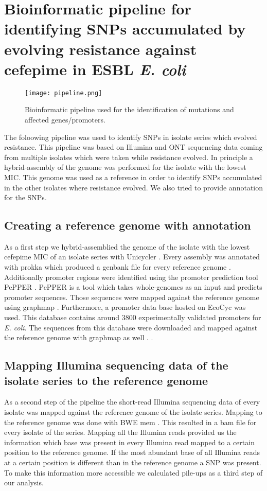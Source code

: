\section{Bioinformatic pipeline for identifying SNPs accumulated by evolving resistance against cefepime in ESBL \textit{E. coli}}
\label{section:pipeline}
\begin{figure}
	\texttt{[image: pipeline.png]}
	\caption{Bioinformatic pipeline used for the identification of mutations and affected genes/promoters.}
	\label{figure:pipeline}
\end{figure}
The foloowing pipeline was used to identify SNPs in isolate series which evolved resistance. This pipeline was based on Illumina and ONT sequencing data coming from multiple isolates which were taken while resistance evolved. In principle a hybrid-assembly of the genome was performed for the isolate with the lowest MIC. This genome was used as a reference in order to identify SNPs accumulated in the other isolates where resistance evolved. We also tried to provide annotation for the SNPs. 

\subsection{Creating a reference genome with annotation} 
As a first step we hybrid-assemblied the genome of the isolate with the lowest cefepime MIC of an isolate series with Unicycler \cite{wick_unicycler:_2017}. Every assembly was annotated with prokka which produced a genbank file for every reference genome \cite{seemann_prokka:_2014}. Additionally promoter regions were identified using the promoter prediction tool PePPER \cite{pepper}. PePPER is a tool which takes whole-genomes as an input and predicts promoter sequences. Those sequences were mapped against the reference genome using graphmap \cite{sovic_fast_2016}. Furthermore, a promoter data base hosted on EcoCyc was used. This database contains around 3800 experimentally validated promoters for \textit{E. coli}\cite{noauthor_smarttable_nodate}. The sequences from this database were downloaded and mapped against the reference genome with graphmap as well \cite{sovic_fast_2016}. 
\label{section:annotatiion_ref}.

\subsection{Mapping Illumina sequencing data of the isolate series to the reference genome}
As a second step of the pipeline the short-read Illumina sequencing data of every isolate was mapped against the reference genome of the isolate series. Mapping to the reference genome was done with BWE mem \cite{li_fast_2009}. This resulted in a bam file for every isolate of the series. Mapping all the Illumina reads provided us the information which base was present in every Illumina read mapped to a certain position to the reference genome. If the most abundant base of all Illumina reads at a certain position is different than in the reference genome a SNP was present. To make this information more accessible we calculated pile-ups as a third step of our analysis. 


